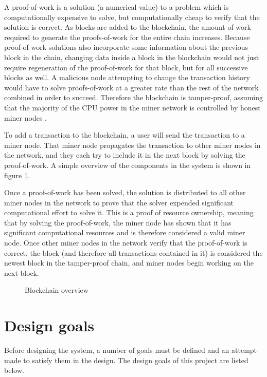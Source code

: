 A proof-of-work is a solution (a numerical value) to a problem which is computationally expensive to solve, but computationally cheap to verify that the solution is correct. As blocks are added to the blockchain, the amount of work required to generate the proofs-of-work for the entire chain increases. Because proof-of-work solutions also incorporate some information about the previous block in the chain, changing data inside a block in the blockchain would not just require regeneration of the proof-of-work for that block, but for all successive blocks as well. A malicious node attempting to change the transaction history would have to solve proofs-of-work at a greater rate than the rest of the network combined in order to succeed. Therefore the blockchain is tamper-proof, assuming that the majority of the CPU power in the miner network is controlled by  honest miner nodes \cite{bitcoin}.

To add a transaction to the blockchain, a user will send the transaction to a miner node. That miner node propagates the transaction to other miner nodes in the network, and they each try to include it in the next block by solving the proof-of-work. A simple overview of the components in the system is shown in figure \ref{fig:blockchain}.

Once a proof-of-work has been solved, the solution is distributed to all other miner nodes in the network to prove that the solver expended significant computational effort to solve it. This is a proof of resource ownership, meaning that by solving the proof-of-work, the miner node has shown that it has significant computational resources and is therefore considered a valid miner node. Once other miner nodes in the network verify that the proof-of-work is correct, the block (and therefore all transactions contained in it) is considered the newest block in the tamper-proof chain, and miner nodes begin working on the next block.

\begin{figure}[H]
\begin{center}

\end{center}
\caption{Blockchain overview}
\label{fig:blockchain}
\end{figure}

\section{Design goals} \label{sec:design_goals}
Before designing the system, a number of goals must be defined and an attempt made to satisfy them in the design. The design goals of this project are listed below.

